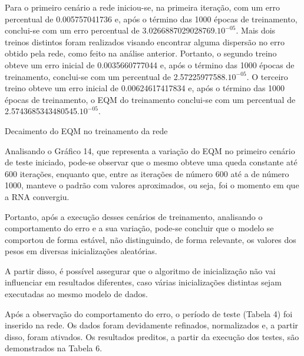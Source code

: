 Para o primeiro cenário a rede iniciou-se, na primeira iteração, com um erro percentual de 0.005757041736 e, após o término das 1000 épocas de treinamento, conclui-se com um erro percentual de 3.0266887029028769.$10^{-05}$. Mais dois treinos distintos foram realizados visando encontrar alguma dispersão no erro obtido pela rede, como feito na análise anterior. Portanto, o segundo treino obteve um erro inicial de 0.0035660777044 e, após o término das 1000 épocas de treinamento, conclui-se com um percentual de 2.57225977588.$10^{-05}$. O terceiro treino obteve um erro inicial de 0.00624617417834 e, após o término das 1000 épocas de treinamento, o EQM do treinamento conclui-se com um percentual de 2.5743685343480545.$10^{-05}$.
\begin{grafico}[h]
	\centering
	\caption{Decaimento do EQM no treinamento da rede}
	\label{lingua}
\end{grafico}

Analisando o Gráfico 14, que representa a variação do EQM no primeiro cenário de teste iniciado, pode-se observar que o mesmo obteve uma queda constante até 600 iterações, enquanto que, entre as iterações de número 600 até a de número 1000, manteve o padrão com valores aproximados, ou seja, foi o momento em que a RNA convergiu. 

Portanto, após a execução desses cenários de treinamento, analisando o comportamento do erro e a sua variação, pode-se concluir que o modelo se comportou de forma estável, não distinguindo, de forma relevante, os valores dos pesos em diversas inicializações aleatórias.

A partir disso, é possível assegurar que o algoritmo de inicialização não vai influenciar em resultados diferentes, caso várias inicializações distintas sejam executadas ao mesmo modelo de dados. 

Após a observação do comportamento do erro, o período de teste (Tabela 4) foi inserido na rede. Os dados foram devidamente refinados, normalizados e, a partir disso, foram ativados. Os resultados preditos, a partir da execução dos testes, são demonstrados na Tabela 6. 

